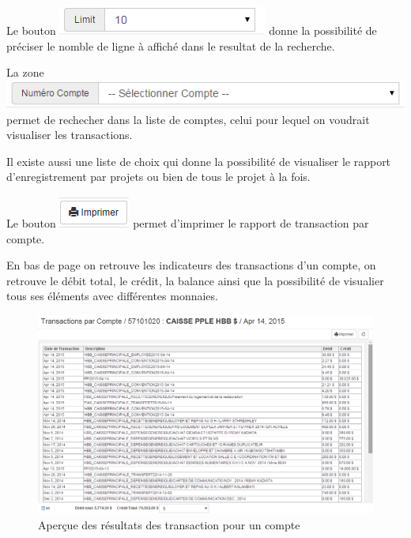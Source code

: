 \documentclass[12pt,a4paper]{report}
\begin{document}
Le bouton \includegraphics[scale=0.7]{pic/Limit10T.png} donne la possibilité de préciser le nomble de ligne à affiché dans le resultat de la recherche. 

La zone  \includegraphics[scale=0.7]{pic/RechCompte.png} permet de rechecher dans la liste de comptes, celui pour lequel on voudrait visualiser les transactions.

Il existe aussi une liste de choix qui donne la possibilité de visualiser le rapport d'enregistrement par projets ou bien de tous le projet à la fois.

Le bouton \includegraphics[scale=0.7]{pic/Print.png} permet d'imprimer le rapport de transaction par compte.

En bas de page on retrouve les indicateurs des transactions d'un compte, on retrouve le débit total, le crédit, la balance ainsi que la possibilité de visualier tous ses éléments avec différentes monnaies. 

\begin{figure}[h]
\begin{center}
\includegraphics[width=12cm]{pic/TraByAccount.png}
\end{center}
\caption{Aperçue des résultats des transaction pour un compte}
\label{Aperçue des résultats des transaction pour un compte}
\end{figure}
\end{document}
